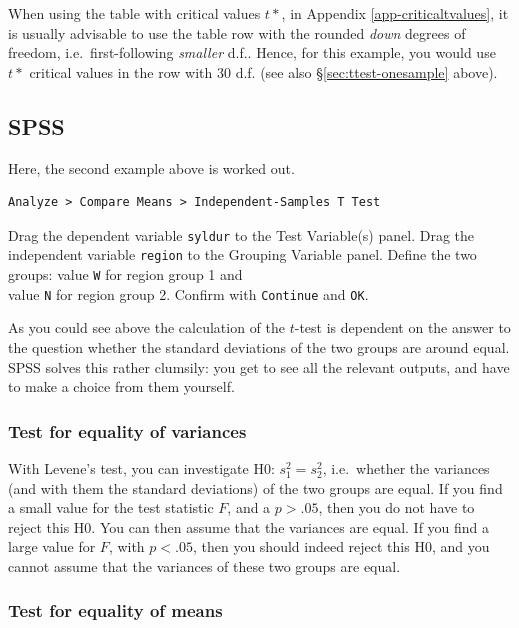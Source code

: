 \documentclass[
]{book}
\begin{document}
When using the table with critical values \(t*\), in
Appendix \ref{app-criticaltvalues}, it is usually advisable to use the table row
with the rounded \emph{down} degrees of freedom, i.e.~first-following \emph{smaller} d.f..
Hence, for this example, you would use \(t*\) critical values in the row with \(30\) d.f.
(see also §\ref{sec:ttest-onesample} above).

\subsection{SPSS}\label{sec:SPSS-ttest-unpaired}

Here, the second example above is worked out.

\begin{verbatim}
Analyze > Compare Means > Independent-Samples T Test
\end{verbatim}

Drag the dependent variable \texttt{syldur} to the Test Variable(s) panel.
Drag the independent variable \texttt{region} to the Grouping
Variable panel. Define the two groups: value \texttt{W} for region group 1 and\\
value \texttt{N} for region group 2. Confirm with \texttt{Continue} and \texttt{OK}.

As you could see above the calculation of the \(t\)-test is dependent on the
answer to the question whether the standard deviations of the two groups
are around equal. SPSS solves this rather clumsily: you get to see all the
relevant outputs, and have to make a choice from them yourself.

\subsubsection{Test for equality of variances}\label{test-for-equality-of-variances}

With Levene's test, you can investigate H0: \(s^2_1 = s^2_2\), i.e.~whether
the variances (and with them the standard deviations) of the two groups
are equal. If you find a small value for the test statistic \(F\),
and a \(p>.05\), then you do not have to reject this H0. You can then assume
that the variances are equal. If you find a large value for \(F\),
with \(p<.05\), then you should indeed reject this H0, and you cannot
assume that the variances of these two groups are equal.

\subsubsection{Test for equality of means}\label{test-for-equality-of-means}
\end{document}
